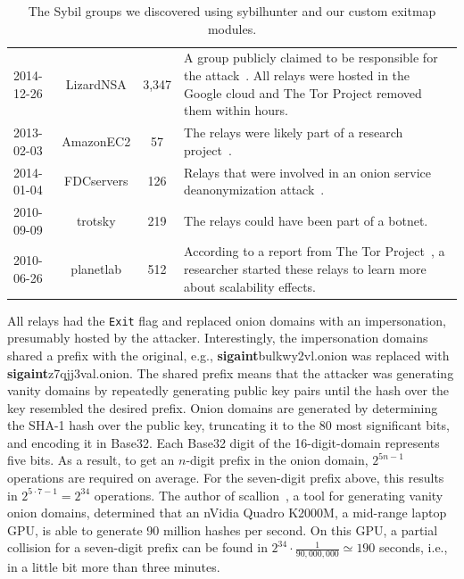 \begin{table}[t]
\begin{tabular}{l c c p{10cm}}
2014-12-26 & LizardNSA & 3,347 & A group publicly claimed to be responsible for
the attack~\cite{lizards}.  All relays were hosted in the Google cloud and The
Tor Project removed them within hours. \\

2013-02-03 & AmazonEC2 & 57 & The relays were likely part of a research
project~\cite{Biryukov2013a}. \\

2014-01-04 & FDCservers & 126 & Relays that were involved in an onion service
deanonymization attack~\cite{cmucert}. \\

2010-09-09 & trotsky & 219 & The relays could have been part of a botnet. \\

2010-06-26 & planetlab & 512 & According to a report from The Tor
Project~\cite{progressreport}, a researcher started these relays to learn more
about scalability effects. \\
\end{tabular}
\caption{The Sybil groups we discovered using sybilhunter and our custom exitmap
modules.}
\label{tab:sybils}
\end{table}

All relays had the \texttt{Exit} flag and replaced onion domains with an
impersonation, presumably hosted by the attacker.  Interestingly, the
impersonation domains shared a prefix with the original, e.g.,
\textbf{sigaint}bulkwy2vl.onion was replaced with
\textbf{sigaint}z7qjj3val.onion.  The shared prefix means that the attacker was
generating vanity domains by repeatedly generating public key pairs until the
hash over the key resembled the desired prefix.  Onion domains are generated by
determining the SHA-1 hash over the public key, truncating it to the 80 most
significant bits, and encoding it in Base32.  Each Base32 digit of the
16-digit-domain represents five bits.  As a result, to get an $n$-digit prefix
in the onion domain, $2^{5 n - 1}$ operations are required on average.  For the
seven-digit prefix above, this results in $2^{5 \cdot 7 - 1} = 2^{34}$
operations.  The author of scallion~\cite{scallion}, a tool for generating
vanity onion domains, determined that an nVidia Quadro K2000M, a mid-range
laptop GPU, is able to generate 90 million hashes per second.  On this GPU, a
partial collision for a seven-digit prefix can be found in $2^{34} \cdot
\frac{1}{90,000,000} \simeq 190$ seconds, i.e., in a little bit more than three
minutes.

